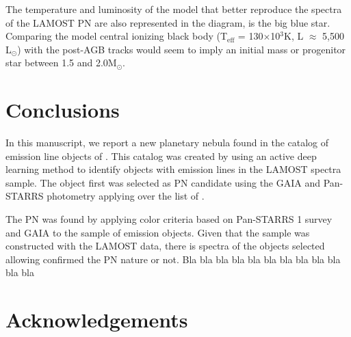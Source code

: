 \documentclass[fleqn,usenatbib]{mnras}
\begin{document}
The temperature and luminosity of the model that better reproduce the spectra of the
LAMOST PN are also represented in the diagram, is the big blue star.
Comparing the model central ionizing black body (T$_{\text{eff}}$ = 130$\times$10$^{3}$K,
L $\approx$ 5,500 L$_{\odot}$) with the post-AGB tracks would seem to imply an
initial mass or progenitor star between 1.5 and 2.0M$_{\odot}$.

\section{Conclusions}
\label{sec:conclu}

In this manuscript, we report a new planetary nebula found
in the catalog of emission line objects of \citet{Skoda:2020}.
This catalog was created by using an active deep learning method
to identify objects with emission lines in the LAMOST spectra sample.
The object first was selected as PN candidate using the GAIA
and Pan-STARRS photometry applying over the list of \citet{Skoda:2020}.

The PN was found by applying color criteria based on Pan-STARRS 1
 survey and GAIA to the sample of emission objects.
Given that the \citet{Skoda:2020} sample was constructed
with the LAMOST data, there is spectra of the objects selected
allowing confirmed the PN nature or not.
{\sc Bla bla bla bla bla bla bla bla bla bla bla bla}

\section*{Acknowledgements}
\end{document}
